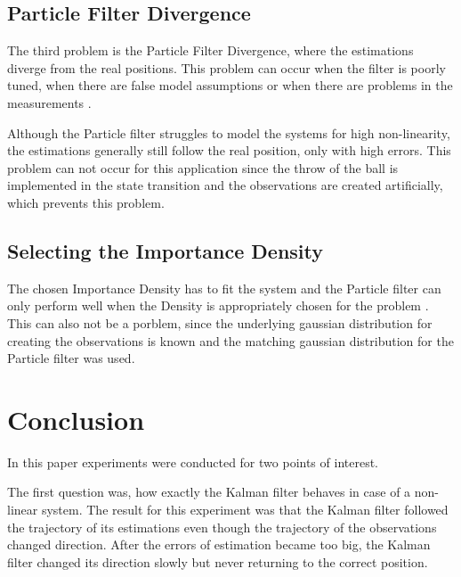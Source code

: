 \documentclass[conference]{IEEEtran}
\begin{document}

\subsection{Particle Filter Divergence}

The third problem is the Particle Filter Divergence, where the estimations diverge from the real positions. 
This problem can occur when the filter is poorly tuned, when there are false model assumptions or when there are problems in the measurements \cite{b4}. 

Although the Particle filter struggles to model the systems for high non-linearity, the estimations generally still follow the real position, only with high errors.
This problem can not occur for this application since the throw of the ball is implemented in the state transition and the observations are created artificially, which prevents this problem.  

\subsection{Selecting the Importance Density}
The chosen Importance Density has to fit the system and the Particle filter can only perform well when the Density is appropriately chosen for the problem \cite{b4}. 
This can also not be a porblem, since the underlying gaussian distribution for creating the observations is known and the matching gaussian distribution for the Particle filter was used.


\section{Conclusion}

In this paper experiments were conducted for two points of interest.

The first question was, how exactly the Kalman filter behaves in case of a non-linear system.  
The result for this experiment was that the Kalman filter followed the trajectory of its estimations even though the trajectory of the observations changed direction. 
After the errors of estimation became too big, the Kalman filter changed its direction slowly but never returning to the correct position.
\end{document}
